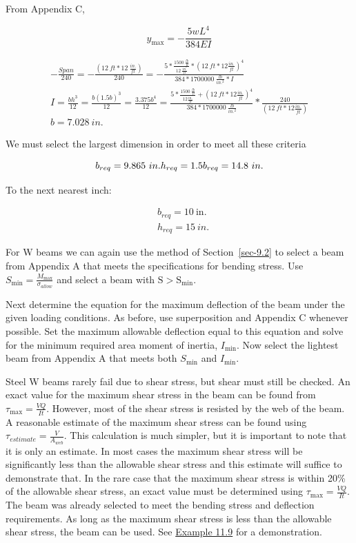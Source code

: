 \documentclass[
  letterpaper,
  DIV=11,
  numbers=noendperiod]{scrreprt}
\theoremstyle{definition}
\theoremstyle{remark}
\begin{document}
\begin{tcolorbox}
\begin{tcolorbox}
From Appendix C,

\[
y_{\max }=- \frac{5 w L^4}{384 E I}
\]

\[
\begin{gathered}
-\frac{Span}{240}=-\frac{(12{~ft}*12~\frac{in.}{ft})}{240}=-\frac{5*\frac{1500~\frac{lb}{ft}}{12~\frac{in.}{ft}}*(12{~ft}*12\frac{in.}{ft})^4}{384*1700000~\frac{lb}{in.^2}*I} \\
I=\frac{bh^3}{12}=\frac{b(1.5b)^3}{12}=\frac{3.375b^4}{12}=\frac{5*\frac{1500~\frac{lb}{ft}}{12\frac{in.}{ft}}+(12{~ft}*12\frac{in.}{ft})^4}{384*1700000~\frac{lb}{in.^2}}*\frac{240}{\left(12{~ft}*12\frac{in.}{ft}\right)}
\\ b=7.028{~in.}
\end{gathered}
\]

We must select the largest dimension in order to meet all these criteria

\[
b_{req}=9.865{~in.} \\ 
h_{req}=1.5b_{req}=14.8{~in.}
\]

To the next nearest inch:

\[
\begin{aligned} & b_{req}=10 \mathrm{~in.} \\ & h_{req}=15{~in.}\end{aligned}
\]

\end{tcolorbox}

\end{tcolorbox}

For W beams we can again use the method of Section~\ref{sec-9.2} to
select a beam from Appendix A that meets the specifications for bending
stress. Use \(S_{\min }=\frac{M_{\max }}{\sigma_{allow}}\) and select a
beam with \(\mathrm{S}>\mathrm{S}_{\min }\).

Next determine the equation for the maximum deflection of the beam under
the given loading conditions. As before, use superposition and Appendix
C whenever possible. Set the maximum allowable deflection equal to this
equation and solve for the minimum required area moment of inertia,
\(I_{\min }\). Now select the lightest beam from Appendix A that meets
both \(S_{\min }\) and \(I_{\min }\).

Steel W beams rarely fail due to shear stress, but shear must still be
checked. An exact value for the maximum shear stress in the beam can be
found from \(\tau_{\max }=\frac{V Q}{I t}\). However, most of the shear
stress is resisted by the web of the beam. A reasonable estimate of the
maximum shear stress can be found using
\(\tau_{estimate}=\frac{V}{A_{web}}\). This calculation is much simpler,
but it is important to note that it is only an estimate. In most cases
the maximum shear stress will be significantly less than the allowable
shear stress and this estimate will suffice to demonstrate that. In the
rare case that the maximum shear stress is within 20\% of the allowable
shear stress, an exact value must be determined using
\(\tau_{\max }=\frac{V Q}{I t}\). The beam was already selected to meet
the bending stress and deflection requirements. As long as the maximum
shear stress is less than the allowable shear stress, the beam can be
used. See \hyperref[example-11.9]{Example 11.9} for a demonstration.
\end{document}

